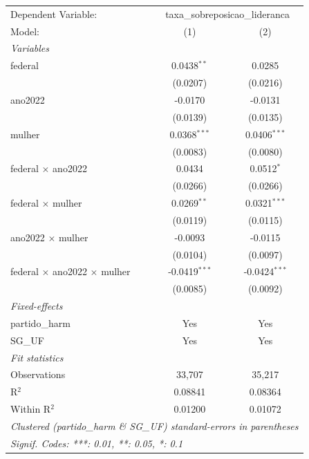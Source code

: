 
\begingroup
\centering
\begin{tabular}{lcc}
   \tabularnewline \midrule \midrule
   Dependent Variable: & \multicolumn{2}{c}{taxa\_sobreposicao\_lideranca}\\
   Model:                                     & (1)             & (2)\\  
   \midrule
   \emph{Variables}\\
   federal                                    & 0.0438$^{**}$   & 0.0285\\   
                                              & (0.0207)        & (0.0216)\\   
   ano2022                                    & -0.0170         & -0.0131\\   
                                              & (0.0139)        & (0.0135)\\   
   mulher                                     & 0.0368$^{***}$  & 0.0406$^{***}$\\   
                                              & (0.0083)        & (0.0080)\\   
   federal $\times$ ano2022                   & 0.0434          & 0.0512$^{*}$\\   
                                              & (0.0266)        & (0.0266)\\   
   federal $\times$ mulher                    & 0.0269$^{**}$   & 0.0321$^{***}$\\   
                                              & (0.0119)        & (0.0115)\\   
   ano2022 $\times$ mulher                    & -0.0093         & -0.0115\\   
                                              & (0.0104)        & (0.0097)\\   
   federal $\times$ ano2022 $\times$ mulher   & -0.0419$^{***}$ & -0.0424$^{***}$\\   
                                              & (0.0085)        & (0.0092)\\   
   \midrule
   \emph{Fixed-effects}\\
   partido\_harm                              & Yes             & Yes\\  
   SG\_UF                                     & Yes             & Yes\\  
   \midrule
   \emph{Fit statistics}\\
   Observations                               & 33,707          & 35,217\\  
   R$^2$                                      & 0.08841         & 0.08364\\  
   Within R$^2$                               & 0.01200         & 0.01072\\  
   \midrule \midrule
   \multicolumn{3}{l}{\emph{Clustered (partido\_harm \& SG\_UF) standard-errors in parentheses}}\\
   \multicolumn{3}{l}{\emph{Signif. Codes: ***: 0.01, **: 0.05, *: 0.1}}\\
\end{tabular}
\par\endgroup


